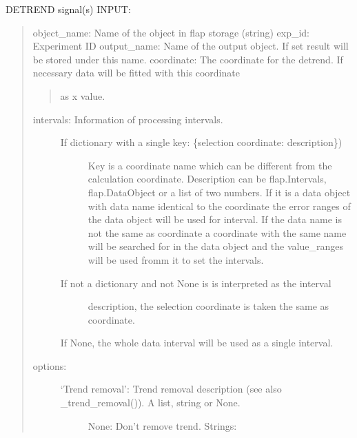 \documentclass[letterpaper,10pt,english]{sphinxmanual}
\begin{document}
\begin{fulllineitems}
\label{\detokenize{data_object:flap.data_object.detrend}}
DETREND signal(s)
INPUT:
\begin{quote}

object\_name: Name of the object in flap storage (string)
exp\_id: Experiment ID
output\_name: Name of the output object. If set result will be  stored under this name.
coordinate: The coordinate for the detrend. If necessary data will be fitted with this coordinate
\begin{quote}

as x value.
\end{quote}
\begin{description}
\item[{intervals: Information of processing intervals.}] \leavevmode\begin{description}
\item[{If dictionary with a single key: \{selection coordinate: description\})}] \leavevmode
Key is a coordinate name which can be different from the calculation
coordinate.
Description can be flap.Intervals, flap.DataObject or
a list of two numbers. If it is a data object with data name identical to
the coordinate the error ranges of the data object will be used for
interval. If the data name is not the same as coordinate a coordinate with the
same name will be searched for in the data object and the value\_ranges
will be used fromm it to set the intervals.

\item[{If not a dictionary and not None is is interpreted as the interval}] \leavevmode
description, the selection coordinate is taken the same as
coordinate.

\end{description}

If None, the whole data interval will be used as a single interval.

\item[{options:}] \leavevmode\begin{description}
\item[{‘Trend removal’: Trend removal description (see also \_trend\_removal()). A list, string or None.}] \leavevmode
None: Don’t remove trend.
Strings:
\begin{quote}


\end{quote}
\end{description}
\end{description}
\end{quote}
\end{fulllineitems}
\end{document}

